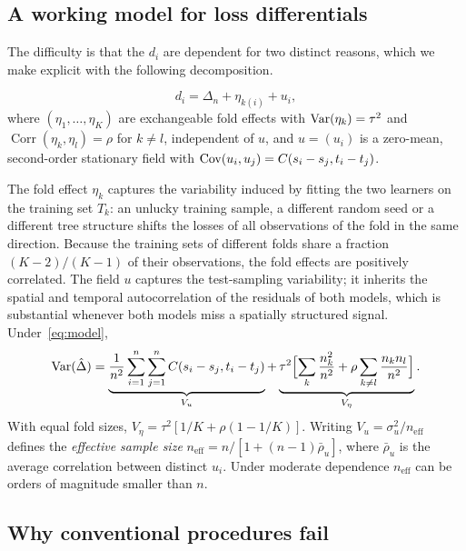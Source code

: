 \subsection{A working model for loss differentials}

The difficulty is that the $d_i$ are dependent for two distinct reasons, which we make explicit with the following decomposition.

\begin{definition}\label{def:model}
\begin{equation}\label{eq:model}
d_i=\Delta_n+\eta_{k(i)}+u_i ,
\end{equation}
where $(\eta_1,\dots,\eta_K)$ are exchangeable fold effects with $\operatorname{Var}(\eta_k)=\tau^2$ and $\operatorname{Corr}(\eta_k,\eta_l)=\rho$ for $k\neq l$, independent of $u$, and $u=(u_i)$ is a zero-mean, second-order stationary field with $\operatorname{Cov}(u_i,u_j)=C(s_i-s_j,t_i-t_j)$.
\end{definition}

The fold effect $\eta_k$ captures the variability induced by fitting the two learners on the training set $T_k$: an unlucky training sample, a different random seed or a different tree structure shifts the losses of all observations of the fold in the same direction. Because the training sets of different folds share a fraction $(K-2)/(K-1)$ of their observations, the fold effects are positively correlated. The field $u$ captures the test-sampling variability; it inherits the spatial and temporal autocorrelation of the residuals of both models, which is substantial whenever both models miss a spatially structured signal. Under~\eqref{eq:model},
\begin{equation}\label{eq:var}
\operatorname{Var}(\hat\Delta)=\underbrace{\frac{1}{n^2}\sum_{i=1}^n\sum_{j=1}^n C(s_i-s_j,t_i-t_j)}_{V_u}+\underbrace{\tau^2\Bigl[\sum_k\frac{n_k^2}{n^2}+\rho\sum_{k\neq l}\frac{n_kn_l}{n^2}\Bigr]}_{V_\eta}.
\end{equation}
With equal fold sizes, $V_\eta=\tau^2[1/K+\rho(1-1/K)]$. Writing $V_u=\sigma_u^2/n_{\mathrm{eff}}$ defines the \emph{effective sample size} $n_{\mathrm{eff}}=n/[1+(n-1)\bar\rho_u]$, where $\bar\rho_u$ is the average correlation between distinct $u_i$. Under moderate dependence $n_{\mathrm{eff}}$ can be orders of magnitude smaller than $n$.

\subsection{Why conventional procedures fail}

